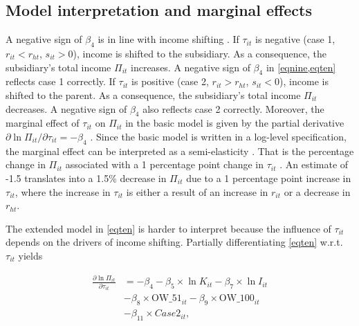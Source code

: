 \documentclass[10pt,twocolumn,oneside,cmyk]{article}
\begin{document}
\subsection{Model interpretation and marginal effects} \label{sec:Model interpretation and marginal effects}
A negative sign of $\beta_4$ is in line with income shifting \parencite[447]{becker_cross-border_2012}. If $\tau_{it}$ is negative (case 1, $r_{it} < r_{ht}$, $s_{it} > 0$), income is shifted to the subsidiary. As a consequence, the subsidiary's total income $\Pi_{it}$ increases. A negative sign of $\beta_4$ in \cref{eqnine,eqten} reflects case 1 correctly. If $\tau_{it}$ is positive (case 2, $r_{it} > r_{ht}$, $s_{it} < 0$), income is shifted to the parent. As a consequence, the subsidiary's total income $\Pi_{it}$ decreases. A negative sign of $\beta_4$ also reflects case 2 correctly. Moreover, the marginal effect of $\tau_{it}$ on $\Pi_{it}$ in the basic model is given by the partial derivative $\partial \ln \Pi_{it}/\partial \tau_{it}=-\beta_4$ \textcite[11]{buettner_anti_2017}. Since the basic model is written in a log-level specification, the marginal effect can be interpreted as a semi-elasticity \parencite[43-46]{wooldridge_introductory_2009}. That is the percentage change in $\Pi_{it}$ associated with a 1 percentage point change in $\tau_{it}$ \parencite[429]{dharmapala_what_2014}. An estimate of -1.5 translates into a 1.5\% decrease in $\Pi_{it}$ due to a 1 percentage point increase in $\tau_{it}$, where the increase in $\tau_{it}$ is either a result of an increase in $r_{it}$ or a decrease in $r_{ht}$.

The extended model in \cref{eqten} is harder to interpret because the influence of $\tau_{it}$ depends on the drivers of income shifting. Partially differentiating \cref{eqten} w.r.t. $\tau_{it}$ yields

\begin{equation}\label{eqeleven}
 \begin{split}
  \frac{\partial \ln \Pi_{it}}{\partial \tau_{it}} &= -\beta_4 -\beta_5 \times \ln K_{it} -\beta_7 \times \ln I_{it}\\
	&- \beta_8 \times \text{OW\_51}_{it} - \beta_9 \times \text{OW\_100}_{it}\\
	&-\beta_{11} \times Case2_{it},
 \end{split}
\end{equation}
\end{document}
